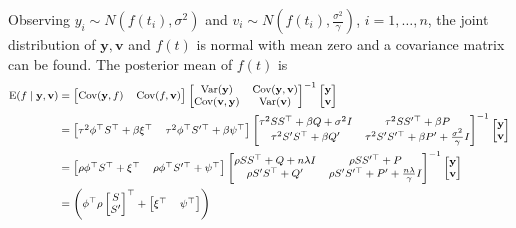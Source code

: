 Observing $y_i\sim N\left(f (t_i),\sigma^2\right)$ and $v_i\sim N\left(f (t_i),\frac{\sigma^2}{\gamma}\right)$, $i=1,\ldots,n$, the joint distribution of $\mathbf{y},\mathbf{v}$ and $f(t)$ is normal with mean zero and a covariance matrix can be found. The posterior mean of $f(t)$ is 
\begin{align}\label{GPrhoeq}\footnotesize
\begin{split}
\E (f \mid  \mathbf{\mathbf{y}},\mathbf{v}) & =
\begin{bmatrix}
\Cov (\mathbf{y},f) & \Cov (f,\mathbf{\mathbf{v}})
\end{bmatrix}\begin{bmatrix}
\Var(\mathbf{y}) & \Cov(\mathbf{y},\mathbf{v})\\
\Cov(\mathbf{v},\mathbf{y}) & \Var(\mathbf{v})
\end{bmatrix}^{-1}\begin{bmatrix}
\mathbf{y}\\\mathbf{v}
\end{bmatrix}\\
&=
\begin{bmatrix}
\tau^2 \phi^\top S^\top+\beta \xi^\top & \tau^2  \phi^\top S'^\top+\beta \psi^\top 
\end{bmatrix}\begin{bmatrix}
\tau^2 SS^\top+\beta Q+\sigma^2 I& \tau^2 SS'^\top+\beta P\\
\tau^2 S'S^\top+\beta Q'& \tau^2 S'S'^\top+\beta P'+\frac{\sigma^2}{\gamma}I
\end{bmatrix}^{-1}\begin{bmatrix}
\mathbf{y}\\\mathbf{v}
\end{bmatrix}\\
&=
\begin{bmatrix}
\rho\phi^\top S^\top+ \xi^\top & \rho\phi^\top S'^\top+\psi^\top
\end{bmatrix}\begin{bmatrix}
\rho SS^\top+Q+n\lambda I& \rho SS'^\top+P\\
\rho S'S^\top+Q'& \rho S'S'^\top+P'+\frac{n\lambda}{\gamma}I
\end{bmatrix}^{-1}\begin{bmatrix}
\mathbf{y}\\\mathbf{v}
\end{bmatrix}\\
&=\left(\phi^\top \rho 
\begin{bmatrix} S\\ S' \end{bmatrix}^\top + \begin{bmatrix} \xi^\top & \psi^\top\end{bmatrix}\right)

\end{split}
\end{align}
